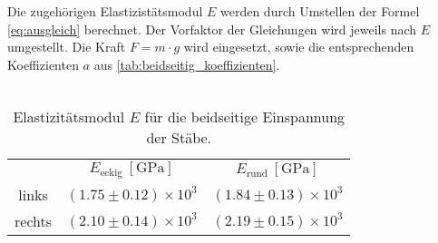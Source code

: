 Die zugehörigen Elastizistätsmodul $E$ werden durch Umstellen der Formel \eqref{eq:ausgleich} berechnet. Der Vorfaktor der Gleichungen %
wird jeweils nach $E$ umgestellt. Die Kraft $F = m \cdot g$ wird eingesetzt, sowie die entsprechenden Koeffizienten $a$ aus \autoref{tab:beidseitig_koeffizienten}.\\
\\
\begin{table}
    \centering
    \caption{Elastizitätsmodul $E$ für die beidseitige Einspannung der Stäbe.}
    \label{tab:beidseitig_E}
    \begin{tabular}{c|c c|}
        \toprule
        & $E_{\text{eckig}}\:[\unit{\giga\pascal}]$ & $E_{\text{rund}}\:[\unit{\giga\pascal}]$\\
        \cmidrule(lr){2-3}
        links & $(1.75 \pm 0.12)\times 10^3$ & $(1.84 \pm 0.13)\times 10^3$\\
        rechts & $(2.10 \pm 0.14)\times 10^3$ & $(2.19 \pm 0.15)\times 10^3$\\
        \bottomrule
    \end{tabular}
\end{table}
\newpage
